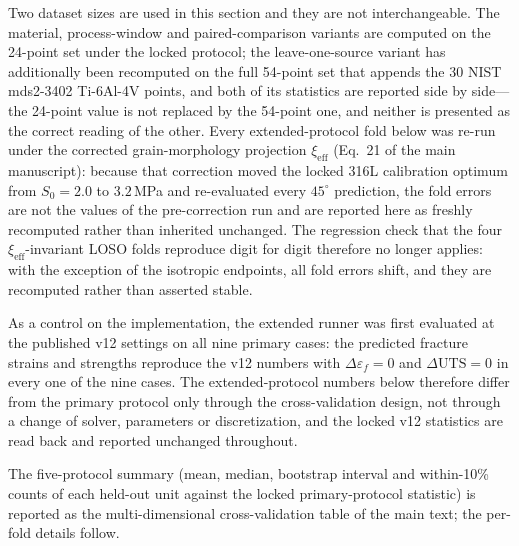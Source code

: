 \documentclass[11pt,a4paper,twocolumn]{article}
\providecommand{\ang}[1]{\ensuremath{#1^{\circ}}}
\begin{document}
Two dataset sizes are used in this section and they are not interchangeable. The material, process-window and paired-comparison variants are computed on the 24-point set under the locked protocol; the leave-one-source variant has additionally been recomputed on the full 54-point set that appends the 30 NIST mds2-3402 Ti-6Al-4V points, and both of its statistics are reported side by side---the 24-point value is not replaced by the 54-point one, and neither is presented as the correct reading of the other. Every extended-protocol fold below was re-run under the corrected grain-morphology projection $\xi_{\mathrm{eff}}$ (Eq.~21 of the main manuscript): because that correction moved the locked 316L calibration optimum from $S_0 = 2.0$ to $3.2$\,MPa and re-evaluated every $\ang{45}$ prediction, the fold errors are not the values of the pre-correction run and are reported here as freshly recomputed rather than inherited unchanged. The regression check that the four $\xi_{\mathrm{eff}}$-invariant LOSO folds reproduce digit for digit therefore no longer applies: with the exception of the isotropic endpoints, all fold errors shift, and they are recomputed rather than asserted stable.

As a control on the implementation, the extended runner was first evaluated at the published v12 settings
on all nine primary cases: the predicted fracture strains and strengths reproduce the v12 numbers with
$\Delta\varepsilon_f = 0$ and $\Delta\mathrm{UTS} = 0$ in every one of the nine cases. The
extended-protocol numbers below therefore differ from the primary protocol only through the
cross-validation design, not through a change of solver, parameters or discretization, and the locked v12
statistics are read back and reported unchanged throughout.

The five-protocol summary (mean, median, bootstrap interval and within-10\% counts of each held-out unit against the locked primary-protocol statistic) is reported as the multi-dimensional cross-validation table of the main text; the per-fold details follow.
\end{document}
